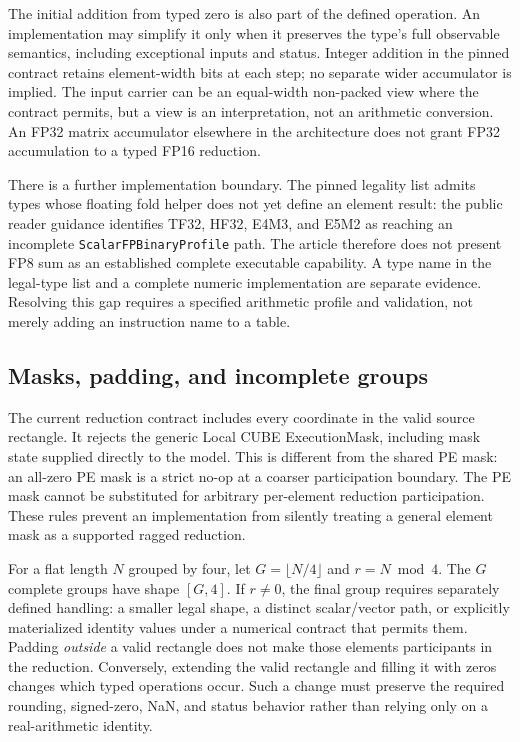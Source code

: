 The initial addition from typed zero is also part of the defined operation. An implementation may simplify it only when it preserves the type's full observable semantics, including exceptional inputs and status. Integer addition in the pinned contract retains element-width bits at each step; no separate wider accumulator is implied. The input carrier can be an equal-width non-packed view where the contract permits, but a view is an interpretation, not an arithmetic conversion. An FP32 matrix accumulator elsewhere in the architecture does not grant FP32 accumulation to a typed FP16 reduction.

There is a further implementation boundary. The pinned legality list admits types whose floating fold helper does not yet define an element result: the public reader guidance identifies TF32, HF32, E4M3, and E5M2 as reaching an incomplete \texttt{ScalarFPBinaryProfile} path. The article therefore does not present FP8 sum as an established complete executable capability. A type name in the legal-type list and a complete numeric implementation are separate evidence. Resolving this gap requires a specified arithmetic profile and validation, not merely adding an instruction name to a table.~\citep{u005-pto-trowsum}

\subsection{Masks, padding, and incomplete groups}

The current reduction contract includes every coordinate in the valid source rectangle. It rejects the generic Local CUBE ExecutionMask, including mask state supplied directly to the model. This is different from the shared PE mask: an all-zero PE mask is a strict no-op at a coarser participation boundary. The PE mask cannot be substituted for arbitrary per-element reduction participation. These rules prevent an implementation from silently treating a general element mask as a supported ragged reduction.~\citep{u005-pto-reduction-legality}

For a flat length $N$ grouped by four, let $G=\lfloor N/4\rfloor$ and $r=N\bmod4$. The $G$ complete groups have shape $[G,4]$. If $r\ne0$, the final group requires separately defined handling: a smaller legal shape, a distinct scalar/vector path, or explicitly materialized identity values under a numerical contract that permits them. Padding \emph{outside} a valid rectangle does not make those elements participants in the reduction. Conversely, extending the valid rectangle and filling it with zeros changes which typed operations occur. Such a change must preserve the required rounding, signed-zero, NaN, and status behavior rather than relying only on a real-arithmetic identity.

